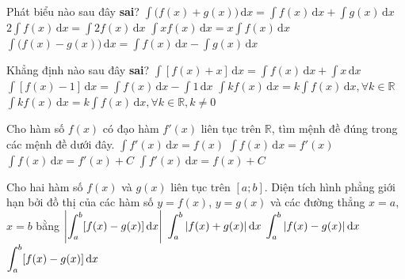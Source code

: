 \begin{ex}%
	Phát biểu  nào sau đây \textbf{sai}?
	 \choice
		{$\displaystyle\int\big(f(x)+g(x)\big) \mathrm{\,d}x=\displaystyle\int f(x) \mathrm{\,d} x+\displaystyle\int  g(x) \mathrm{\,d} x$}
		{$2 \displaystyle\int f(x)  \mathrm{\,d}x=\displaystyle\int 2 f(x) \mathrm{\,d} x$}
		{\True $\displaystyle\int x f(x) \mathrm{\,d}x=x \displaystyle\int f(x) \mathrm{\,d}  x$}
		{$\displaystyle\int\big(f(x)-g(x)\big)  \mathrm{\,d}x=\displaystyle\int f(x) \mathrm{\,d} x-\displaystyle\int g(x) \mathrm{\,d} x$}
\end{ex}

\begin{ex}%
	Khẳng định nào  sau đây {\bf sai}?
	\choice 
		{$\displaystyle\int\left[f(x)+x\right]  \mathrm{\,d}x=\displaystyle\int f(x) \mathrm{\,d}x+\displaystyle\int x \mathrm{\,d} x$}
		{$\displaystyle\int\left[f(x)-1\right] \mathrm{\,d}x=\displaystyle\int f(x) \mathrm{\,d}x-\displaystyle\int  1\mathrm{\,d} x$}
		{\True $\displaystyle\int k f(x) \mathrm{\,d}x=k \displaystyle\int f(x) \mathrm{\,d}x,  \forall k \in \mathbb{R}$}
		{$\displaystyle\int k f(x) \mathrm{\,d}x=k \displaystyle\int f(x) \mathrm{\,d}x, \forall k \in \mathbb{R}, k  \neq 0$}
\end{ex}

\begin{ex}%
	Cho hàm  số $f(x)$ có đạo hàm $f'(x)$ liên tục trên $\mathbb{R}$, tìm mệnh đề đúng trong các mệnh đề dưới đây.
	 \choice
		{$\displaystyle\int  f'(x)\mathrm{\,d}x=f(x)$}
		 {$\displaystyle\int f(x)\mathrm{\,d}x=f'(x)$}
		{$\displaystyle\int f(x)\mathrm{\,d}x=f'(x)+C$} 
		{\True $\displaystyle\int f'(x)\mathrm{\,d}x=f(x)+C$} 
\end{ex}

\begin{ex}%
	Cho hai hàm số $f(x)$ và $g(x)$ liên tục trên $[a; b]$. Diện tích hình phẳng giới hạn bởi đồ thị của các hàm số  $y=f(x)$, $y=g(x)$ và các đường thẳng $x=a$, $x=b$ bằng
	\choice 
		{$\left|\displaystyle\displaystyle\int_{a}^{b}[f(x)-g(x)]  \mathrm{\,d} x\right|$}
		{$\displaystyle\displaystyle\int_{a}^{b}|f(x)+g(x)| \mathrm{\,d}  x$}
		{\True  $\displaystyle\displaystyle\int_{a}^{b}|f(x)-g(x)| \mathrm{\,d} x$}
		 {$\displaystyle\displaystyle\int_{a}^{b}[f(x)-g(x)] \mathrm{\,d} x$}
\end{ex}

